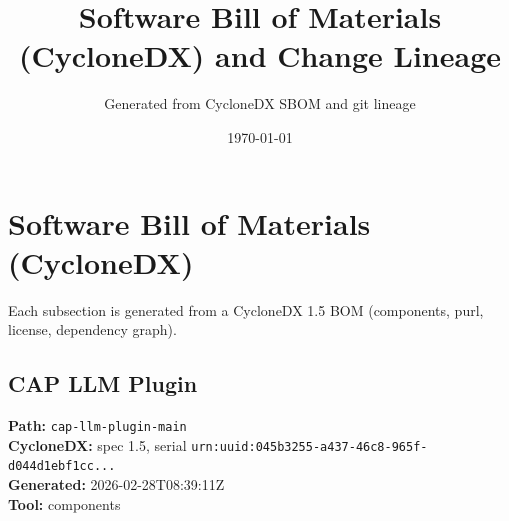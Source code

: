 \documentclass[11pt]{article}
\title{Software Bill of Materials (CycloneDX) and Change Lineage}
\author{Generated from CycloneDX SBOM and git lineage}
\date{\today}
\begin{document}
\maketitle
\tableofcontents
\newpage
\section{Software Bill of Materials (CycloneDX)}
Each subsection is generated from a CycloneDX 1.5 BOM (components, purl, license, dependency graph).

\subsection{CAP LLM Plugin}
\textbf{Path:} \texttt{cap-llm-plugin-main}
\\ \textbf{CycloneDX:} spec 1.5, serial \texttt{urn:uuid:045b3255-a437-46c8-965f-d044d1ebf1cc...}
\\ \textbf{Generated:} 2026-02-28T08:39:11Z
\\ \textbf{Tool:} components
\end{document}
